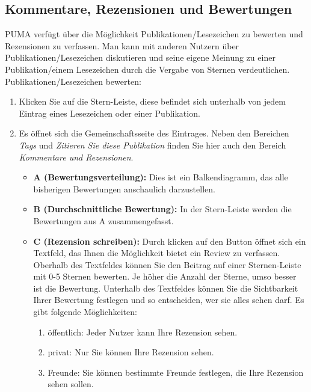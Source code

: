 
\subsection{Kommentare, Rezensionen und Bewertungen}
PUMA verfügt über die Möglichkeit Publikationen/Lesezeichen zu bewerten und Rezensionen zu verfassen. Man kann mit anderen Nutzern über Publikationen/Lesezeichen diskutieren und seine eigene Meinung zu einer Publikation/einem Lesezeichen durch die Vergabe von Sternen verdeutlichen.
\newline
\newline
Publikationen/Lesezeichen bewerten:
\begin{enumerate}
    \item Klicken Sie auf die Stern-Leiste, diese befindet sich unterhalb von jedem Eintrag eines Lesezeichen oder einer Publikation.  
    \item Es öffnet sich die Gemeinschaftsseite des Eintrages. Neben den Bereichen \textit{Tags} und \textit{Zitieren Sie diese Publikation} finden Sie hier auch den Bereich \textit{Kommentare und Rezensionen}. 
    \begin{itemize} %
        \item \textbf{A (Bewertungsverteilung):} Dies ist ein Balkendiagramm, das alle bisherigen Bewertungen anschaulich darzustellen. %
        \item \textbf{B (Durchschnittliche Bewertung):} In der Stern-Leiste  werden die Bewertungen aus A zusammengefasst.
        \item \textbf{C (Rezension schreiben):} Durch klicken auf den Button öffnet sich ein Textfeld, das Ihnen die Möglichkeit bietet ein Review  zu verfassen. Oberhalb des Textfeldes können Sie den Beitrag auf einer Sternen-Leiste mit 0-5 Sternen bewerten. Je höher die Anzahl der Sterne, umso besser ist die Bewertung. Unterhalb des Textfeldes können Sie die Sichtbarkeit Ihrer Bewertung festlegen und so entscheiden, wer sie alles sehen darf. Es gibt folgende Möglichkeiten:
        \begin{enumerate}
            \item öffentlich: Jeder Nutzer kann Ihre Rezension sehen.
            \item privat: Nur Sie können Ihre Rezension sehen.
            \item Freunde: Sie können bestimmte Freunde festlegen, die Ihre Rezension sehen sollen.

\end{enumerate}
\end{itemize}
\end{enumerate}
